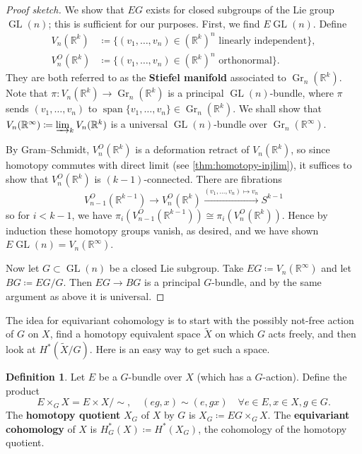 \documentclass{report}
\theoremstyle{plain}
\theoremstyle{definition}
\newtheorem{definition}[theorem]{Definition}
\theoremstyle{remark}
\newcommand{\bR}{\mathbb{R}}
\DeclareMathOperator{\vspan}{span}
\DeclareMathOperator{\GL}{GL}
\DeclareMathOperator{\Gr}{Gr}
\begin{document}
\begin{proof}[Proof sketch]
  We show that $EG$ exists for closed subgroups of the Lie group
  $\GL(n)$; this is sufficient for our purposes. First, we find
  $E\GL(n)$. Define
  \begin{align*}
    V_n(\bR^k) &\coloneqq \{(v_1, \ldots, v_n) \in (\bR^k)^n \text{ linearly independent}\}, \\
    V_n^O(\bR^k) &\coloneqq \{(v_1, \ldots, v_n) \in (\bR^k)^n \text{ orthonormal}\}.
  \end{align*}
  They are both referred to as the {\bf Stiefel manifold} associated
  to $\Gr_n(\bR^k)$. Note that $\pi\colon V_n(\bR^k) \to \Gr_n(\bR^k)$
  is a principal $\GL(n)$-bundle, where $\pi$ sends $(v_1, \ldots,
  v_n)$ to $\vspan\{v_1, \ldots, v_n\} \in \Gr_n(\bR^k)$. We shall
  show that $V_n(\bR^\infty) \coloneqq \varinjlim_k V_n(\bR^k)$ is a
  universal $\GL(n)$-bundle over $\Gr_n(\bR^\infty)$.

  By Gram--Schmidt, $V_n^O(\bR^k)$ is a deformation retract of
  $V_n(\bR^k)$, so since homotopy commutes with direct limit (see
  \ref{thm:homotopy-injlim}), it suffices to show that $V_n^O(\bR^k)$
  is $(k-1)$-connected. There are fibrations
  \[ V_{n-1}^O(\bR^{k-1}) \to V_n^O(\bR^k) \xrightarrow{(v_1, \ldots, v_n) \mapsto v_n} S^{k-1} \]
  so for $i < k-1$, we have $\pi_i(V_{n-1}^O(\bR^{k-1})) \cong
  \pi_i(V_n^O(\bR^k))$. Hence by induction these homotopy groups
  vanish, as desired, and we have shown $E\GL(n) = V_n(\bR^\infty)$.

  Now let $G \subset \GL(n)$ be a closed Lie subgroup. Take $EG
  \coloneqq V_n(\bR^\infty)$ and let $BG \coloneqq EG/G$. Then $EG \to
  BG$ is a principal $G$-bundle, and by the same argument as above it
  is universal.
\end{proof}

The idea for equivariant cohomology is to start with the possibly
not-free action of $G$ on $X$, find a homotopy equivalent space
$\tilde{X}$ on which $G$ acts freely, and then look at
$H^*(\tilde{X}/G)$. Here is an easy way to get such a space.

\begin{definition}
  Let $E$ be a $G$-bundle over $X$ (which has a $G$-action). Define
  the product
  \[ E \times_G X = E \times X / \sim, \quad (eg, x) \sim (e, gx) \quad \forall e \in E, x \in X, g \in G. \]
  The {\bf homotopy quotient} $X_G$ of $X$ by $G$ is $X_G \coloneqq EG
  \times_G X$. The {\bf equivariant cohomology} of $X$ is $H^*_G(X)
  \coloneqq H^*(X_G)$, the cohomology of the homotopy quotient.
\end{definition}
\end{document}

